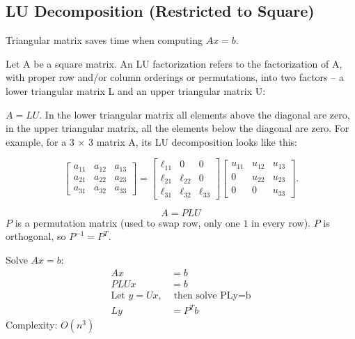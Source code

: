 \documentclass[11pt,a4paper]{article}
\begin{document}
\subsection{LU Decomposition (Restricted to Square)}
Triangular matrix saves time when computing $Ax=b$.

Let A be a square matrix. An LU factorization refers to the factorization of A, with proper row and/or column orderings or permutations, into two factors – a lower triangular matrix L and an upper triangular matrix U:

${\displaystyle A=LU.}$
In the lower triangular matrix all elements above the diagonal are zero, in the upper triangular matrix, all the elements below the diagonal are zero. For example, for a 3 × 3 matrix A, its LU decomposition looks like this:

$${\displaystyle {\begin{bmatrix}a_{11}&a_{12}&a_{13}\\a_{21}&a_{22}&a_{23}\\a_{31}&a_{32}&a_{33}\end{bmatrix}}={\begin{bmatrix}\ell _{11}&0&0\\\ell _{21}&\ell _{22}&0\\\ell _{31}&\ell _{32}&\ell _{33}\end{bmatrix}}{\begin{bmatrix}u_{11}&u_{12}&u_{13}\\0&u_{22}&u_{23}\\0&0&u_{33}\end{bmatrix}}.}$$

$$A=PLU$$
$P$ is a permutation matrix (used to swap row, only one $1$ in every row). $P$ is orthogonal, so $P^{-1}=P^T$.

Solve $Ax=b$:
\begin{equation}
    \begin{aligned}
        Ax&=b\\
        PLUx&=b\\
        \text{Let }y=Ux,&\text{ then solve PLy=b}\\
        Ly&=P^Tb
    \end{aligned}
    \nonumber
\end{equation}
Complexity: $O(n^3)$
\end{document}
